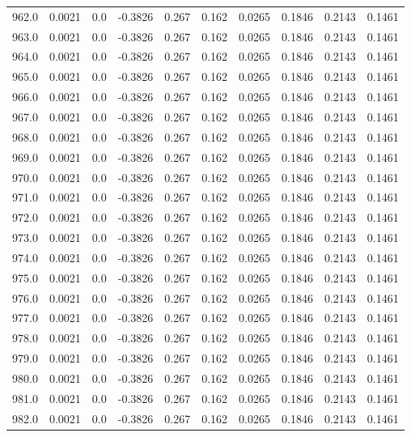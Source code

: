 \begin{longtable}{lrrrrrrrrr}
962.0 & 0.0021 & 0.0 & -0.3826 & 0.267 & 0.162 & 0.0265 & 0.1846 & 0.2143 & 0.1461 \\
963.0 & 0.0021 & 0.0 & -0.3826 & 0.267 & 0.162 & 0.0265 & 0.1846 & 0.2143 & 0.1461 \\
964.0 & 0.0021 & 0.0 & -0.3826 & 0.267 & 0.162 & 0.0265 & 0.1846 & 0.2143 & 0.1461 \\
965.0 & 0.0021 & 0.0 & -0.3826 & 0.267 & 0.162 & 0.0265 & 0.1846 & 0.2143 & 0.1461 \\
966.0 & 0.0021 & 0.0 & -0.3826 & 0.267 & 0.162 & 0.0265 & 0.1846 & 0.2143 & 0.1461 \\
967.0 & 0.0021 & 0.0 & -0.3826 & 0.267 & 0.162 & 0.0265 & 0.1846 & 0.2143 & 0.1461 \\
968.0 & 0.0021 & 0.0 & -0.3826 & 0.267 & 0.162 & 0.0265 & 0.1846 & 0.2143 & 0.1461 \\
969.0 & 0.0021 & 0.0 & -0.3826 & 0.267 & 0.162 & 0.0265 & 0.1846 & 0.2143 & 0.1461 \\
970.0 & 0.0021 & 0.0 & -0.3826 & 0.267 & 0.162 & 0.0265 & 0.1846 & 0.2143 & 0.1461 \\
971.0 & 0.0021 & 0.0 & -0.3826 & 0.267 & 0.162 & 0.0265 & 0.1846 & 0.2143 & 0.1461 \\
972.0 & 0.0021 & 0.0 & -0.3826 & 0.267 & 0.162 & 0.0265 & 0.1846 & 0.2143 & 0.1461 \\
973.0 & 0.0021 & 0.0 & -0.3826 & 0.267 & 0.162 & 0.0265 & 0.1846 & 0.2143 & 0.1461 \\
974.0 & 0.0021 & 0.0 & -0.3826 & 0.267 & 0.162 & 0.0265 & 0.1846 & 0.2143 & 0.1461 \\
975.0 & 0.0021 & 0.0 & -0.3826 & 0.267 & 0.162 & 0.0265 & 0.1846 & 0.2143 & 0.1461 \\
976.0 & 0.0021 & 0.0 & -0.3826 & 0.267 & 0.162 & 0.0265 & 0.1846 & 0.2143 & 0.1461 \\
977.0 & 0.0021 & 0.0 & -0.3826 & 0.267 & 0.162 & 0.0265 & 0.1846 & 0.2143 & 0.1461 \\
978.0 & 0.0021 & 0.0 & -0.3826 & 0.267 & 0.162 & 0.0265 & 0.1846 & 0.2143 & 0.1461 \\
979.0 & 0.0021 & 0.0 & -0.3826 & 0.267 & 0.162 & 0.0265 & 0.1846 & 0.2143 & 0.1461 \\
980.0 & 0.0021 & 0.0 & -0.3826 & 0.267 & 0.162 & 0.0265 & 0.1846 & 0.2143 & 0.1461 \\
981.0 & 0.0021 & 0.0 & -0.3826 & 0.267 & 0.162 & 0.0265 & 0.1846 & 0.2143 & 0.1461 \\
982.0 & 0.0021 & 0.0 & -0.3826 & 0.267 & 0.162 & 0.0265 & 0.1846 & 0.2143 & 0.1461 \\

\end{longtable}
